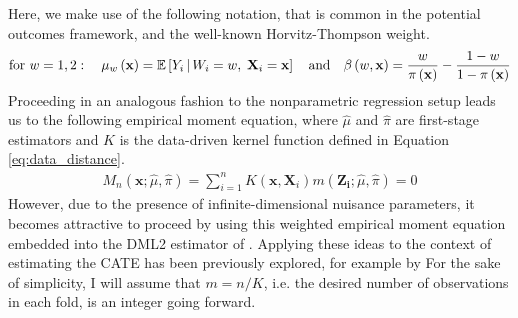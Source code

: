 Here, we make use of the following notation, that is common in the potential outcomes framework, and the well-known Horvitz-Thompson weight.
\begin{equation}
	\text{for }  w = 1,2: \quad \mu_w\left(\mathbf{x}\right) = \mathbb{E}\left[Y_i \, \middle| \, W_i = w, \; \mathbf{X}_i = \mathbf{x}\right]
	\quad \text{and} \quad
	\beta\left(w, \mathbf{x}\right) = \frac{w}{\pi\left(\mathbf{x}\right)} - \frac{1 - w}{1 - \pi\left(\mathbf{x}\right)}
\end{equation}
Proceeding in an analogous fashion to the nonparametric regression setup leads us to the following empirical moment equation, where $\hat{\mu}$ and $\hat{\pi}$ are first-stage estimators and $K$ is the data-driven kernel function defined in Equation \ref{eq:data_distance}.
\begin{equation}
	\begin{aligned}
		M_{n}\left(\mathbf{x}; \hat{\mu}, \hat{\pi}\right)
		= \sum_{i = 1}^{n} K(\mathbf{x}, \mathbf{X}_i) m\left(\mathbf{Z_i}; \hat{\mu}, \hat{\pi}\right)
		= 0
	\end{aligned}
\end{equation}
However, due to the presence of infinite-dimensional nuisance parameters, it becomes attractive to proceed by using this weighted empirical moment equation embedded into the DML2 estimator of \citet{chernozhukov_doubledebiased_2018}.
Applying these ideas to the context of estimating the CATE has been previously explored, for example by \citet{semenova_debiased_2021}
For the sake of simplicity, I will assume that $m = n/K$, i.e. the desired number of observations in each fold, is an integer going forward.
